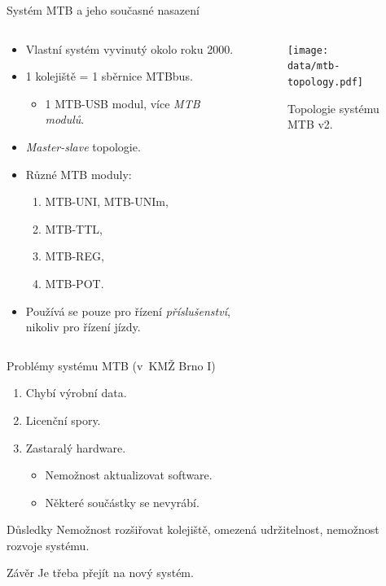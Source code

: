 \documentclass[aspectratio=169]{beamer}
\begin{document}
\begin{frame}{Systém MTB a jeho současné nasazení}
\begin{columns}
	\begin{column}{.6\textwidth}
		\begin{itemize}
		\item Vlastní systém vyvinutý okolo roku 2000.
		\item 1 kolejiště = 1 sběrnice MTBbus.
		\begin{itemize}
			\item 1 MTB-USB modul, více \textit{MTB modulů}.
		\end{itemize}
		\item \textit{Master-slave} topologie.
		\item Různé MTB moduly:
		\begin{enumerate}
			\item MTB-UNI, MTB-UNIm,
			\item MTB-TTL,
			\item MTB-REG,
			\item MTB-POT.
		\end{enumerate}
		\item Používá se pouze pro řízení \textit{příslušenství}, nikoliv
		pro řízení jízdy.
		\end{itemize}
	\end{column}
	\begin{column}{.4\textwidth}
		\begin{figure}
		\texttt{[image: data/mtb-topology.pdf]}
		\caption{Topologie systému MTB v2.}
		\end{figure}
	\end{column}
\end{columns}
\end{frame}


\begin{frame}{Problémy systému MTB (v KMŽ Brno I)}
\begin{enumerate}
\item Chybí výrobní data.
\item Licenční spory.
\item Zastaralý hardware.
\begin{itemize}
\item Nemožnost aktualizovat software.
\item Některé součástky se nevyrábí.
\end{itemize}
\end{enumerate}
\pause
\begin{alertblock}{Důsledky}
Nemožnost rozšiřovat kolejiště, omezená udržitelnost, nemožnost rozvoje systému.
\end{alertblock}
\pause
\begin{alertblock}{Závěr}
Je třeba přejít na nový systém.
\end{alertblock}
\end{frame}
\end{document}
